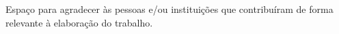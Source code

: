 
\begin{agradecimentos}
  \noindent Espaço para agradecer às pessoas e/ou instituições que contribuíram de forma relevante à elaboração do trabalho.
\end{agradecimentos}